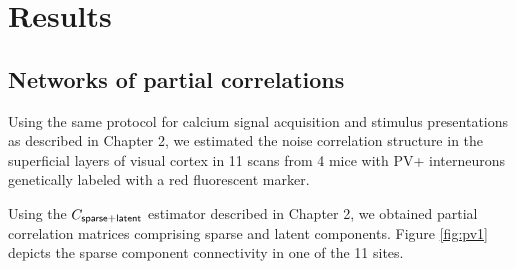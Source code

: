 \section{Results}
\subsection{Networks of partial correlations}
Using the same protocol for calcium signal acquisition  and stimulus presentations as described in Chapter 2, we estimated the noise correlation structure in the superficial layers of visual cortex in 11 scans from 4 mice with PV+ interneurons genetically labeled with a red fluorescent marker.

Using the $C_{\sf sparse+latent}$ estimator described in Chapter 2, we obtained partial correlation matrices comprising sparse and latent components. Figure \ref{fig:pv1} depicts the sparse component connectivity in one of the 11 sites.


\clearpage
